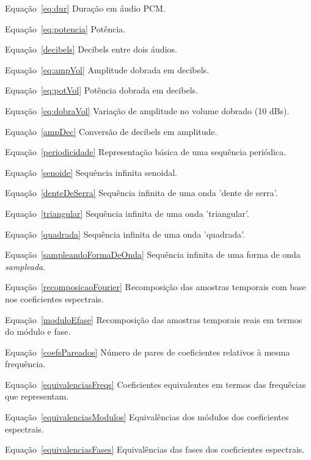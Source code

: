 	\begin{listaespecial}[BIGNAMEWIDTH]
        \item[Equação~\ref{eq:dur}] Duração em áudio PCM.
        \item[Equação~\ref{eq:potencia}] Potência.
        \item[Equação~\ref{decibels}] Decibels entre dois áudios.
        \item[Equação~\ref{eq:ampVol}]  Amplitude dobrada em decibels.
        \item[Equação~\ref{eq:potVol}] Potência dobrada em decibels.
        \item[Equação~\ref{eq:dobraVol}] Variação de amplitude no volume dobrado (10 dBs).
        \item[Equação~\ref{ampDec}] Conversão de decibels em amplitude.
        \item[Equação~\ref{periodicidade}] Representação básica de uma sequência periódica.
        \item[Equação~\ref{senoide}] Sequência infinita senoidal.
        \item[Equação~\ref{denteDeSerra}] Sequência infinita de uma onda 'dente de serra'.
        \item[Equação~\ref{triangular}] Sequência infinita de uma onda 'triangular'.
        \item[Equação~\ref{quadrada}] Sequência infinita de uma onda 'quadrada'.
        \item[Equação~\ref{sampleandoFormaDeOnda}] Sequência infinita de uma forma de onda \emph{sampleada}.
        \item[Equação~\ref{recomposicaoFourier}] Recomposição das amostras temporais com base nos coeficientes espectrais.
        \item[Equação~\ref{moduloEfase}] Recomposição das amostras temporais reais em termos do módulo e fase.
        \item[Equação~\ref{coefsPareados}] Número de pares de coeficientes relativos à mesma frequência.
        \item[Equação~\ref{equivalenciasFreqs}] Coeficientes equivalentes em termos das frequêcias que representam.
        \item[Equação~\ref{equivalenciasModulos}] Equivalências dos módulos dos coeficientes espectrais.
        \item[Equação~\ref{equivalenciasFases}] Equivalências das fases dos coeficientes espectrais.

\end{listaespecial}
